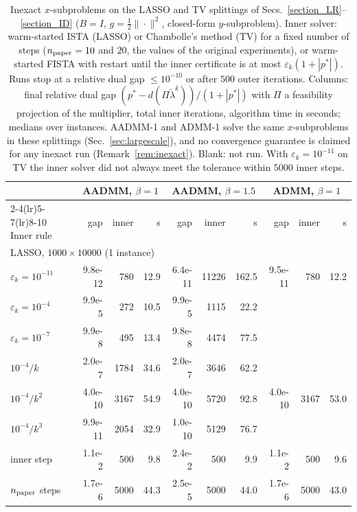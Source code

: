 \begin{table}[htbp]
\centering
\caption{Inexact $x$-subproblems on the LASSO and TV splittings of Secs.~\ref{section_LR}--\ref{section_ID} ($B=I$, $g=\frac12\|\cdot\|^2$, closed-form $y$-subproblem). Inner solver: warm-started ISTA (LASSO) or Chambolle's method (TV) for a fixed number of steps ($n_{\rm paper}=10$ and $20$, the values of the original experiments), or warm-started FISTA with restart until the inner certificate is at most $\varepsilon_k(1+|p^{*}|)$. Runs stop at a relative dual gap $\le10^{-10}$ or after $500$ outer iterations. Columns: final relative dual gap $(p^{*}-d(\Pi\tilde\lambda^{k}))/(1+|p^{*}|)$ with $\Pi$ a feasibility projection of the multiplier, total inner iterations, algorithm time in seconds; medians over instances. AADMM-1 and ADMM-1 solve the same $x$-subproblems in these splittings (Sec.~\ref{sec:largescale}), and no convergence guarantee is claimed for any inexact run (Remark~\ref{rem:inexact}). Blank: not run. With $\varepsilon_k=10^{-11}$ on TV the inner solver did not always meet the tolerance within $5000$ inner steps.}\label{tab:inexact}
\scriptsize\setlength{\tabcolsep}{2.4pt}
\begin{tabular}{lrrrrrrrrr}
\toprule
 & \multicolumn{3}{c}{AADMM, $\beta{=}1$} & \multicolumn{3}{c}{AADMM, $\beta{=}1.5$} & \multicolumn{3}{c}{ADMM, $\beta{=}1$} \\
\cmidrule(lr){2-4}\cmidrule(lr){5-7}\cmidrule(lr){8-10}
Inner rule & gap & inner & s & gap & inner & s & gap & inner & s \\
\midrule
\multicolumn{10}{l}{LASSO, $1000\times10000$ (1 instance)}\\
\quad $\varepsilon_k=10^{-11}$ & 9.8e-12 & 780 & 12.9 & 6.4e-11 & 11226 & 162.5 & 9.5e-11 & 780 & 12.2 \\
\quad $\varepsilon_k=10^{-4}$ & 9.9e-5 & 272 & 10.5 & 9.9e-5 & 1115 & 22.2 &  &  &  \\
\quad $\varepsilon_k=10^{-7}$ & 9.9e-8 & 495 & 13.4 & 9.8e-8 & 4474 & 77.5 &  &  &  \\
\quad $10^{-4}/k$ & 2.0e-7 & 1784 & 34.6 & 2.0e-7 & 3646 & 62.2 &  &  &  \\
\quad $10^{-4}/k^{2}$ & 4.0e-10 & 3167 & 54.9 & 4.0e-10 & 5720 & 92.8 & 4.0e-10 & 3167 & 53.0 \\
\quad $10^{-4}/k^{3}$ & 9.9e-11 & 2054 & 32.9 & 1.0e-10 & 5129 & 76.7 &  &  &  \\
\quad 1 inner step & 1.1e-2 & 500 & 9.8 & 2.4e-2 & 500 & 9.9 & 1.1e-2 & 500 & 9.6 \\
\quad $n_{\rm paper}$ steps & 1.7e-6 & 5000 & 44.3 & 2.5e-5 & 5000 & 44.0 & 1.7e-6 & 5000 & 43.0 \\

\end{tabular}
\end{table}
